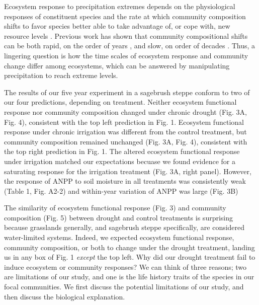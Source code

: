 \documentclass[fleqn,10pt,lineno]{wlpeerj} %
\begin{document}
Ecosystem response to precipitation extremes depends on the
physiological responses of constituent species and the rate at which
community composition shifts to favor species better able to take
advantage of, or cope with, new resource levels \citep{Smith2009}.
Previous work has shown that community compositional shifts can be both
rapid, on the order of years \citep{Hoover2014}, and slow, on order of
decades \citep{Knapp2012, Wilcox2016}. Thus, a lingering question is how
the time scales of ecosystem response and community change differ among
ecosystems, which can be answered by manipulating precipitation to reach
extreme levels.

The results of our five year experiment in a sagebrush steppe conform to
two of our four predictions, depending on treatment. Neither ecosystem
functional response nor community composition changed under chronic
drought (Fig. 3A, Fig. 4), consistent with the top left prediction in
Fig. 1. Ecosystem functional response under chronic irrigation was
different from the control treatment, but community composition remained
unchanged (Fig. 3A, Fig. 4), consistent with the top right prediction in
Fig. 1. The altered ecosystem functional response under irrigation
matched our expectations becuase we found evidence for a saturating
response for the irrigation treatment (Fig. 3A, right panel). However,
the response of ANPP to soil moisture in all treatments was consistently
weak (Table 1, Fig. A2-2) and within-year variation of ANPP was large
(Fig. 3B)

The similarity of ecosystem functional response (Fig. 3) and community
composition (Fig. 5) between drought and control treatments is
surprising because grasslands generally, and sagebrush steppe
specifically, are considered water-limited systems. Indeed, we expected
ecosystem functional response, community composition, or both to change
under the drought treatment, landing us in any box of Fig. 1
\emph{except} the top left. Why did our drought treatment fail to induce
ecosystem or community responses? We can think of three reasons; two are
limitations of our study, and one is the life history traits of the
species in our focal communities. We first discuss the potential
limitations of our study, and then discuss the biological explanation.
\end{document}
